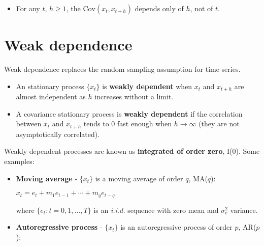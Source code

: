 \documentclass[10pt, a4paper, landscape]{article}
\newcommand{\E}{\mathrm{E}}
\newcommand{\Var}{\mathrm{Var}}
\newcommand{\Cov}{\mathrm{Cov}}
\begin{document}
\begin{multicols}{3}
\begin{itemize}[leftmargin=*]
			\begin{itemize}[leftmargin=*]
				
				\item For any $t$, $h \geq 1$, the $\Cov(x_{t}, x_{t + h})$ depends only of $h$, not of $t$.
			\end{itemize}
		\end{itemize}
		
		\section*{Weak dependence}
		
		Weak dependence replaces the random sampling assumption for time series.
		
		\begin{itemize}[leftmargin=*]
			\item An stationary process $\lbrace x_{t} \rbrace$ is \textbf{weakly dependent} when $x_{t}$ and $x_{t + h}$ are almost independent as $h$ increases without a limit.
			\item A covariance stationary process is \textbf{weakly dependent} if the correlation between $x_{t}$ and $x_{t + h}$ tends to $0$ fast enough when $h \rightarrow \infty$ (they are not asymptotically correlated).
		\end{itemize}
		
		Weakly dependent processes are known as \textbf{integrated of order zero}, I(0). Some examples:
		
		\begin{itemize}[leftmargin=*]
			\item \textbf{Moving average} - $\lbrace x_{t} \rbrace$ is a moving average of order $q$, MA($q$):
			
			\begin{center}
				$x_{t} = e_{t} + m_{1} e_{t - 1} + \cdots + m_{q} e_{t - q}$
			\end{center}
			
			where $\lbrace e_{t} : t = 0, 1, \ldots, T \rbrace$ is an \textsl{i.i.d.} sequence with zero mean and $\sigma^{2}_{e}$ variance.
			
			\item \textbf{Autoregressive process} - $\lbrace x_{t} \rbrace$ is an autoregressive process of order $p$, AR($p$):
			

\end{itemize}
\end{multicols}
\end{document}
